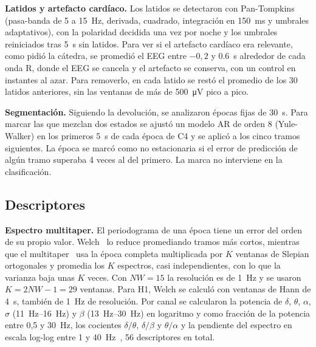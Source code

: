 \textbf{Latidos y artefacto cardíaco.} Los latidos se detectaron con Pan-Tompkins~\cite{pan1985} (pasa-banda de 5 a \SI{15}{\hertz}, derivada, cuadrado, integración en \SI{150}{\milli\second} y umbrales adaptativos), con la polaridad decidida una vez por noche y los umbrales reiniciados tras \SI{5}{\second} sin latidos. Para ver si el artefacto cardíaco era relevante, como pidió la cátedra, se promedió el EEG entre $-0{,}2$ y \SI{0,6}{\second} alrededor de cada onda R, donde el EEG se cancela y el artefacto se conserva, con un control en instantes al azar. Para removerlo, en cada latido se restó el promedio de los 30 latidos anteriores, sin las ventanas de más de \SI{500}{\micro\volt} pico a pico.

\textbf{Segmentación.} Siguiendo la devolución, se analizaron épocas fijas de \SI{30}{\second}. Para marcar las que mezclan dos estados se ajustó un modelo AR de orden 8 (Yule-Walker) en los primeros \SI{5}{\second} de cada época de C4 y se aplicó a los cinco tramos siguientes. La época se marcó como no estacionaria si el error de predicción de algún tramo superaba 4 veces al del primero. La marca no interviene en la clasificación.

\subsection{Descriptores}
\textbf{Espectro multitaper.} El periodograma de una época tiene un error del orden de su propio valor. Welch~\cite{welch1967} lo reduce promediando tramos más cortos, mientras que el multitaper~\cite{thomson1982,prerau2017} usa la época completa multiplicada por $K$ ventanas de Slepian ortogonales y promedia los $K$ espectros, casi independientes, con lo que la varianza baja unas $K$ veces. Con $NW = 15$ la resolución es de \SI{1}{\hertz} y se usaron $K = 2NW - 1 = 29$ ventanas. Para H1, Welch se calculó con ventanas de Hann de \SI{4}{\second}, también de \SI{1}{\hertz} de resolución. Por canal se calcularon la potencia de $\delta$, $\theta$, $\alpha$, $\sigma$ (\SIrange{11}{16}{\hertz}) y $\beta$ (\SIrange{13}{30}{\hertz}) en logaritmo y como fracción de la potencia entre 0,5 y \SI{30}{\hertz}, los cocientes $\delta/\theta$, $\delta/\beta$ y $\theta/\alpha$ y la pendiente del espectro en escala log-log entre 1 y \SI{40}{\hertz}~\cite{donoghue2020}, 56 descriptores en total.

